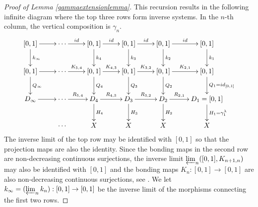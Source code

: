 \documentclass[12pt, leqno]{amsart}
\newcommand{\ui}{[0,1]}
\theoremstyle{definition}\newtheorem{definition}[theorem]{Definition}
\begin{document}
\begin{proof}[Proof of Lemma \ref{gammaextensionlemma}]
This recursion results in the following infinite diagram where the top three rows form inverse systems. In the $n$-th column, the vertical composition is $\gamma_n$.
\[\xymatrix{
\ui \ar[r] \ar[d]^-{k_{\infty}} & \cdots \ar[r]^-{id}  & \ui \ar[d]^-{k_4} \ar[r]^-{id} & \ui \ar[d]^-{k_3}  \ar[r]^-{id} & \ui \ar[d]^-{k_2} \ar[r]^-{id} & \ui \ar[d]^-{k_1} \\
\ui \ar[r] \ar[d]^-{Q_{\infty}} & \cdots  \ar[r]^-{K_{5,4}} & \ui \ar[d]^-{Q_4} \ar[r]^-{K_{4,3}} & \ui \ar[d]^-{Q_3} \ar[r]^-{K_{3,2}} & \ui \ar[d]^-{Q_2} \ar[r]^-{K_{2,1}} & \ui \ar[d]^-{Q_1=id_{\ui}} \\
D_{\infty} \ar[r] & \cdots  \ar[r]^-{R_{5,4}} & D_4  \ar[d]^-{H_4} \ar[r]^-{R_{4,3}} & D_3  \ar[d]^-{H_3}  \ar[r]^-{R_{3,2}} & D_2  \ar[d]^-{H_2} \ar[r]^-{R_{2,1}} & D_1=\ui \ar[d]^-{H_1=\gamma_{1}^{\lambda}} \\
& \cdots  & X & X& X& X
}\]
The inverse limit of the top row may be identified with $\ui$ so that the projection maps are also the identity. Since the bonding maps in the second row are non-decreasing continuous surjections, the inverse limit $\varprojlim_{n}(\ui,K_{n+1,n})$ may also be identified with $\ui$ and the bonding maps $K_n:\ui\to\ui$ are also non-decreasing continuous surjections, see \cite[Theorem 4.8 and Lemma 4.2]{Capel}. We let $k_{\infty}=(\varprojlim_{n}k_{n}):\ui\to\ui$ be the inverse limit of the morphisms connecting the first two rows.


\end{proof}
\end{document}
